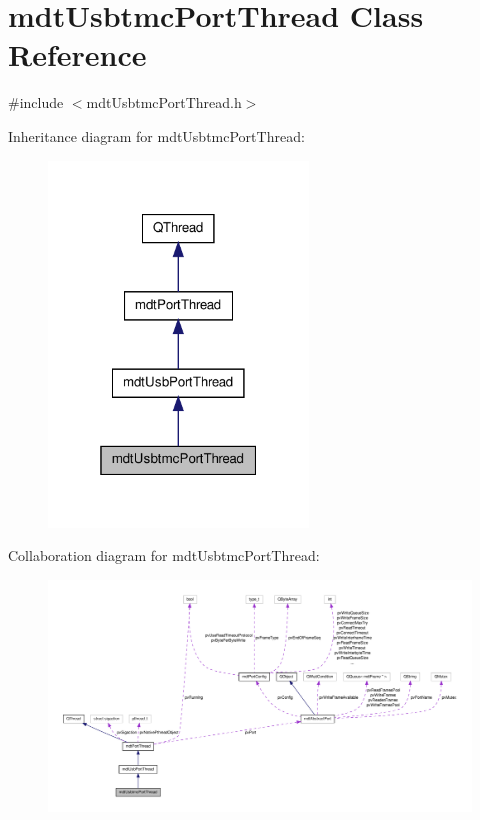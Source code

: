 \hypertarget{classmdt_usbtmc_port_thread}{\section{mdt\-Usbtmc\-Port\-Thread Class Reference}
\label{classmdt_usbtmc_port_thread}
}


{\ttfamily \#include $<$mdt\-Usbtmc\-Port\-Thread.\-h$>$}



Inheritance diagram for mdt\-Usbtmc\-Port\-Thread\-:
\nopagebreak
\begin{figure}[H]
\begin{center}
\leavevmode
\includegraphics[width=196pt]{classmdt_usbtmc_port_thread__inherit__graph}
\end{center}
\end{figure}


Collaboration diagram for mdt\-Usbtmc\-Port\-Thread\-:
\nopagebreak
\begin{figure}[H]
\begin{center}
\leavevmode
\includegraphics[width=350pt]{classmdt_usbtmc_port_thread__coll__graph}
\end{center}
\end{figure}
